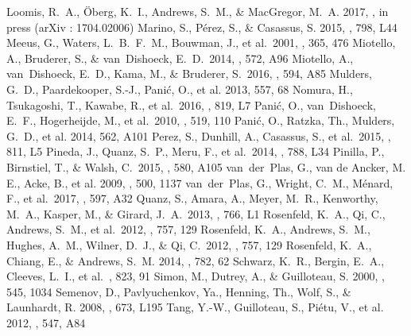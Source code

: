 \documentclass[onecolumn]{aastex6}
\begin{document}
\begin{thebibliography}{}
 Loomis, R.~A., \"{O}berg, K.~I., Andrews, S.~M., \& MacGregor, M.~A. 2017, \apj, in press (arXiv : 1704.02006)
 Marino, S., P\'{e}rez, S., \& Casassus, S. 2015, \apjl,  798, L44
 Meeus, G., Waters, L.~B.~F.~M., Bouwman, J., et al.~2001, \aap, 365, 476
 Miotello, A., Bruderer, S., \& van~Dishoeck, E.~D.~2014, \aap, 572, A96
 Miotello, A., van~Dishoeck, E.~D., Kama, M., \& Bruderer, S.~2016, \aap, 594, A85
 Mulders, G.~D., Paardekooper, S.-J., Pani\'{c}, O., et al. 2013, 557, 68
 Nomura, H., Tsukagoshi, T., Kawabe, R., et al.~2016, \apjl, 819, L7
 Pani\'{c}, O., van~Dishoeck, E.~F., Hogerheijde, M., et al.~2010, \aap, 519, 110
 Pani\'{c}, O., Ratzka, Th., Mulders, G.~D., et al. 2014, 562, A101
 Perez, S., Dunhill, A., Casassus, S., et al.~2015, \apj, 811, L5
 Pineda, J., Quanz, S.~P., Meru, F., et al.~2014, \apjl, 788, L34
 Pinilla, P., Birnstiel, T., \& Walsh, C.~2015, \aap, 580, A105
 van~der~Plas, G., van de Ancker, M. E., Acke, B., et al. 2009, \aap, 500, 1137
  van~der~Plas, G., Wright, C.~M., M\'{e}nard, F., et al.~2017, \aap, 597, A32
 Quanz, S., Amara, A., Meyer, M.~R., Kenworthy, M.~A., Kasper, M., \& Girard, J.~A.~2013, \apjl, 766, L1
 Rosenfeld, K.~A., Qi, C., Andrews, S.~M., et al.~2012, \apj, 757, 129
 Rosenfeld, K.~A., Andrews, S.~M., Hughes, A.~M., Wilner, D.~J., \& Qi, C.~2012, \apj, 757, 129
 Rosenfeld, K.~A., Chiang, E., \& Andrews, S.~M. 2014, \apj, 782, 62
 Schwarz, K.~R., Bergin, E.~A., Cleeves, L.~I., et al.~\apj, 823, 91
 Simon, M., Dutrey, A., \& Guilloteau, S. 2000, \apj, 545, 1034
 Semenov, D., Pavlyuchenkov, Ya., Henning, Th., Wolf, S., \& Launhardt, R. 2008, \apjl, 673, L195
 Tang, Y.-W., Guilloteau, S., Pi\'{e}tu, V., et al. 2012, \aap, 547, A84

\end{thebibliography}
\end{document}
